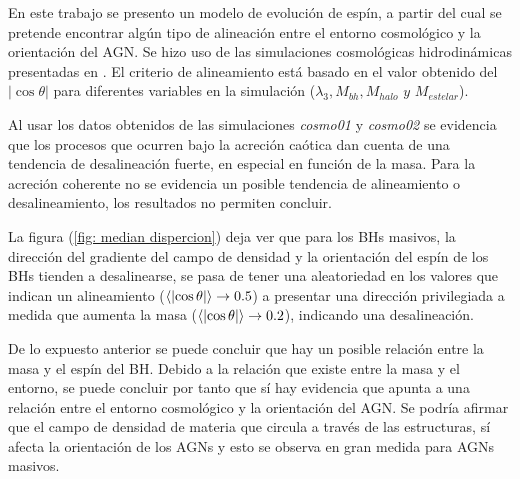 
En este trabajo se presento un modelo de evolución de espín, a partir del cual se pretende encontrar algún tipo de alineación entre el entorno cosmológico y la orientación del AGN. Se hizo uso de las simulaciones cosmológicas hidrodinámicas presentadas en \cite{Bustamante2018b}. El criterio de alineamiento está basado en el valor obtenido del $|\cos \theta|$ para diferentes variables en la simulación ($\lambda_{3}, M_{bh}, M_{halo} \,\, y \,\, M_{estelar}$). 

Al usar los datos obtenidos de las simulaciones {\it{cosmo01}} y {\it{cosmo02}} se evidencia que los procesos que ocurren bajo la acreción caótica dan cuenta de una tendencia de desalineación fuerte, en especial en función de la masa. Para la acreción coherente no se evidencia un posible tendencia de alineamiento o desalineamiento, los resultados no permiten concluir. 

La figura (\ref{fig: median dispercion}) deja ver que para los BHs masivos, la dirección del gradiente del campo de densidad y la orientación del espín de los BHs tienden a desalinearse, se pasa de tener una aleatoriedad en los valores que indican un alineamiento ($\expval{\abs{\cos \theta}}\to 0.5$) a presentar una dirección  privilegiada a medida que aumenta la masa ($\expval{\abs{\cos \theta}}\to 0.2$), indicando una desalineación. %

De lo expuesto anterior se puede concluir que hay un posible relación entre la masa y el espín del BH. Debido a la relación que existe entre la masa y el entorno, se puede concluir por tanto que sí hay evidencia que apunta a una relación entre el entorno cosmológico y la orientación del AGN. Se podría afirmar que el campo de densidad de materia que circula a través de las estructuras, sí afecta la orientación de los AGNs y esto se observa en gran medida para AGNs masivos.




